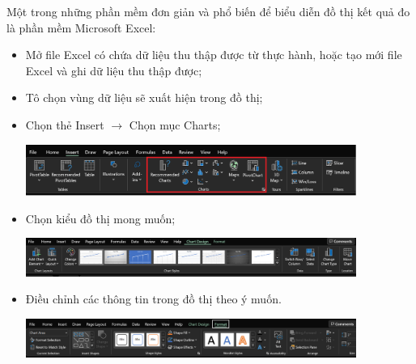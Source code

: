 Một trong những phần mềm đơn giản và phổ biến để biểu diễn đồ thị kết quả đo là phần mềm Microsoft Excel:
\begin{itemize}
	\item Mở file Excel có chứa dữ liệu thu thập được từ thực hành, hoặc tạo mới file Excel và ghi dữ liệu thu thập được;
	\item Tô chọn vùng dữ liệu sẽ xuất hiện trong đồ thị;
	\item Chọn thẻ Insert $\rightarrow$ Chọn mục Charts;
		\begin{center}
			\includegraphics[width=0.85\textwidth]{../figs/G10-4-4}
		\end{center}
	\item Chọn kiểu đồ thị mong muốn;
		\begin{center}
			\includegraphics[width=0.85\textwidth]{../figs/G10-4-5}
		\end{center}
	\item Điều chỉnh các thông tin trong đồ thị theo ý muốn.
		\begin{center}
		\includegraphics[width=0.85\textwidth]{../figs/G10-4-6}
		\end{center}
\end{itemize}